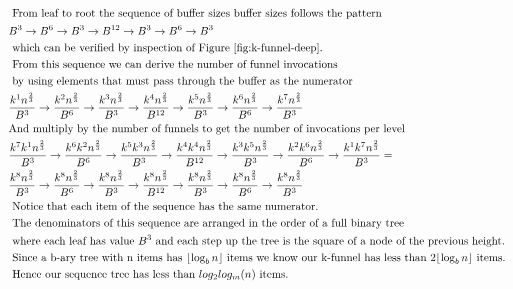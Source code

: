 \documentclass[11pt, letterpaper]{article}
\begin{document}
\begin{align*}
&
\text{ From leaf to root the sequence of buffer sizes buffer sizes follows the pattern }
\\ &
B^3    \rightarrow 
B^6    \rightarrow 
B^3    \rightarrow 
B^{12} \rightarrow 
B^3    \rightarrow 
B^6    \rightarrow 
B^3 
\\ &
\text{ which can be verified by inspection of Figure \ref{fig:k-funnel-deep}. }
\\ &
\text{ From this sequence we can derive the number of funnel invocations } 
\\ &
\text{ by using elements that must pass through the buffer as the numerator}
\\ &
\frac{k^{1} n^\frac{2}{3}}   {B^3}    \rightarrow 
\frac{k^{2} n^\frac{2}{3}}   {B^6}    \rightarrow 
\frac{k^{3} n^\frac{2}{3}}   {B^3}    \rightarrow
\frac{k^{4} n^\frac{2}{3}}   {B^{12}} \rightarrow 
\frac{k^{5} n^\frac{2}{3}}   {B^3}    \rightarrow 
\frac{k^{6} n^\frac{2}{3}}   {B^6}    \rightarrow
\frac{k^{7} n^\frac{2}{3}}   {B^3}
\\ &
\text{And multiply by the number of funnels to get the number of invocations per level}
\\ &
\frac{k^{7}k^{1} n^\frac{2}{3}}   {B^3}    \rightarrow 
\frac{k^{6}k^{2} n^\frac{2}{3}}   {B^6}    \rightarrow 
\frac{k^{5}k^{3} n^\frac{2}{3}}   {B^3}    \rightarrow
\frac{k^{4}k^{4} n^\frac{2}{3}}   {B^{12}} \rightarrow 
\frac{k^{3}k^{5} n^\frac{2}{3}}   {B^3}    \rightarrow 
\frac{k^{2}k^{6} n^\frac{2}{3}}   {B^6}    \rightarrow
\frac{k^{1}k^{7} n^\frac{2}{3}}   {B^3} =
\\ &
\frac{k^{8} n^\frac{2}{3}}   {B^3}    \rightarrow 
\frac{k^{8} n^\frac{2}{3}}   {B^6}    \rightarrow 
\frac{k^{8} n^\frac{2}{3}}   {B^3}    \rightarrow
\frac{k^{8} n^\frac{2}{3}}   {B^{12}} \rightarrow 
\frac{k^{8} n^\frac{2}{3}}   {B^3}    \rightarrow 
\frac{k^{8} n^\frac{2}{3}}   {B^6}    \rightarrow
\frac{k^{8} n^\frac{2}{3}}   {B^3}
\\ &
\text{ Notice that each item of the sequence has the same numerator. }
\\ &
\text{ The denominators of this sequence are arranged in the order of a full binary tree  }
\\ &
\text{ where each leaf has value $B^3$ and each step up the tree is the square of a node of the previous height. }
\\ &
\text{ Since a b-ary tree with n items has $\lfloor \log_bn \rfloor$ items we know our k-funnel has less than $2\lfloor \log_bn \rfloor$ items. }
\\ &
\text { Hence our sequence tree has less than $log_2log_m(n)$ items.}
\end{align*}
\end{document}

